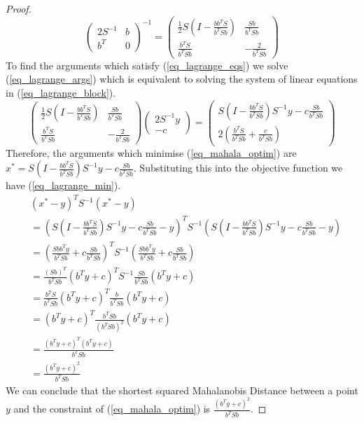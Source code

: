 \begin{proof}
\begin{equation}
\begin{pmatrix}
2S^{-1} & b \\ b^T & 0
\end{pmatrix}^{-1} = \begin{pmatrix}
\frac{1}{2}S(I-\frac{bb^TS}{b^TSb}) & \frac{Sb}{b^TSb} \\ \frac{b^TS}{b^TSb} & -\frac{2}{b^TSb}
\end{pmatrix}
\label{eq_lagrance_block_inverse}
\end{equation}
To find the arguments which satisfy (\ref{eq_lagrange_eqs}) we solve (\ref{eq_lagrange_args}) which is equivalent to solving the system of linear equations in (\ref{eq_lagrange_block}).
\begin{equation}
\begin{pmatrix}
\frac{1}{2}S(I-\frac{bb^TS}{b^TSb}) & \frac{Sb}{b^TSb} \\ \frac{b^TS}{b^TSb} & -\frac{2}{b^TSb} \end{pmatrix} \begin{pmatrix}
2S^{-1}y \\ -c
\end{pmatrix} = \begin{pmatrix}
S(I-\frac{bb^TS}{b^TSb})S^{-1}y - c\frac{Sb}{b^TSb} \\
2(\frac{b^TS}{b^TSb} + \frac{c}{b^TSb})
\end{pmatrix}
\label{eq_lagrange_args}
\end{equation}
Therefore, the arguments which minimise (\ref{eq_mahala_optim}) are $x^* = S(I-\frac{bb^TS}{b^TSb})S^{-1}y - c\frac{Sb}{b^TSb}$. Substituting this into the objective function we have (\ref{eq_lagrange_min}).
\begin{equation}
\begin{aligned}
&\left(x^*-y\right)^TS^{-1}\left(x^*-y\right) \\ 
&= \left(S\left(I-\frac{bb^TS}{b^TSb}\right)S^{-1}y - c\frac{Sb}{b^TSb}-y\right)^TS^{-1}\left( S \left(I-\frac{bb^TS}{b^TSb}\right)S^{-1}y - c \frac{Sb}{b^TSb}-y\right) \\ 
&= \left(\frac{Sbb^Ty}{b^TSb} + c\frac{Sb}{b^TSb}\right)^TS^{-1}\left(\frac{Sbb^Ty}{b^TSb}+ c\frac{Sb}{b^TSb}\right) \\
&= \frac{(Sb)^T}{b^TSb}\left( b^Ty+c \right)^TS^{-1}\frac{Sb}{b^TSb}\left(b^Ty+c\right) \\
&= \frac{b^TS}{b^TSb}\left(b^Ty+c\right)^T\frac{b}{b^TSb}\left(b^Ty+c\right) \\
&= \left(b^Ty+c\right)^T\frac{b^TSb}{(b^TSb)^2}\left(b^Ty+c\right) \\
&= \frac{(b^Ty+c)^T(b^Ty+c)}{b^TSb} \\
&= \frac{(b^Ty+c)^2}{b^TSb}
\end{aligned}
\label{eq_lagrange_min}
\end{equation}
We can conclude that the shortest squared Mahalanobis Distance between a point $y$ and the constraint of (\ref{eq_mahala_optim}) is $\frac{(b^Ty+c)^2}{b^TSb}$.
\end{proof}
